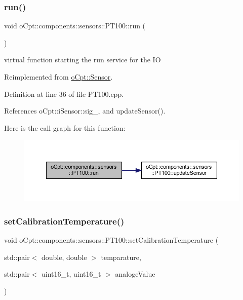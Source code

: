 \subsubsection{\texorpdfstring{run()}{run()}}
{\footnotesize\ttfamily void o\+Cpt\+::components\+::sensors\+::\+P\+T100\+::run (\begin{DoxyParamCaption}{ }\end{DoxyParamCaption})\hspace{0.3cm}{\ttfamily [virtual]}}

virtual function starting the run service for the IO 

Reimplemented from \hyperlink{classo_cpt_1_1_sensor_aef25b0e5f3a8358ee81c97c73909fbe6}{o\+Cpt\+::\+Sensor}.



Definition at line 36 of file P\+T100.\+cpp.



References o\+Cpt\+::i\+Sensor\+::sig\+\_\+, and update\+Sensor().

Here is the call graph for this function\+:\nopagebreak
\begin{figure}[H]
\begin{center}
\leavevmode
\includegraphics[width=350pt]{classo_cpt_1_1components_1_1sensors_1_1_p_t100_a41dfc55a4be7993949feeb5ac013690d_cgraph}
\end{center}
\end{figure}
\hypertarget{classo_cpt_1_1components_1_1sensors_1_1_p_t100_a77e36b92c5eb4b6594fa89114d0fb357}{}\label{classo_cpt_1_1components_1_1sensors_1_1_p_t100_a77e36b92c5eb4b6594fa89114d0fb357} 
\subsubsection{\texorpdfstring{set\+Calibration\+Temperature()}{setCalibrationTemperature()}}
{\footnotesize\ttfamily void o\+Cpt\+::components\+::sensors\+::\+P\+T100\+::set\+Calibration\+Temperature (\begin{DoxyParamCaption}\item[{std\+::pair$<$ double, double $>$}]{temparature,  }\item[{std\+::pair$<$ uint16\+\_\+t, uint16\+\_\+t $>$}]{analoge\+Value }\end{DoxyParamCaption})}



